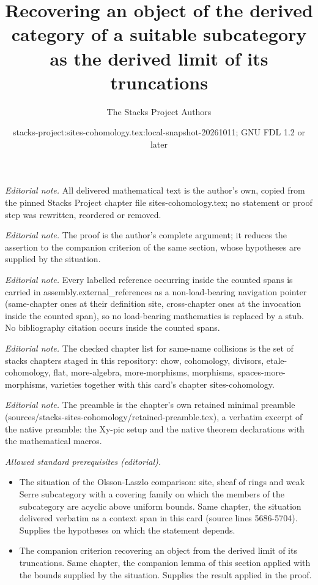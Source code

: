 \documentclass[10pt,a4paper]{amsart}
\title{Recovering an object of the derived category of a suitable subcategory as the derived limit of its truncations}
\author{The Stacks Project Authors}
\date{stacks-project:sites-cohomology.tex:local-snapshot-20261011; GNU FDL 1.2 or later}
\theoremstyle{plain}
\theoremstyle{definition}
\theoremstyle{remark}
\numberwithin{equation}{subsection}
\begin{document}
\maketitle
\noindent\textit{Editorial note.} All delivered mathematical text is the author's own, copied from the pinned Stacks Project chapter file sites-cohomology.tex; no statement or proof step was rewritten, reordered or removed.\par\medskip
\noindent\textit{Editorial note.} The proof is the author's complete argument; it reduces the assertion to the companion criterion of the same section, whose hypotheses are supplied by the situation.\par\medskip
\noindent\textit{Editorial note.} Every labelled reference occurring inside the counted spans is carried in assembly.external\_references as a non-load-bearing navigation pointer (same-chapter ones at their definition site, cross-chapter ones at the invocation inside the counted span), so no load-bearing mathematics is replaced by a stub. No bibliography citation occurs inside the counted spans.\par\medskip
\noindent\textit{Editorial note.} The checked chapter list for same-name collisions is the set of stacks chapters staged in this repository: chow, cohomology, divisors, etale-cohomology, flat, more-algebra, more-morphisms, morphisms, spaces-more-morphisms, varieties together with this card's chapter sites-cohomology.\par\medskip
\noindent\textit{Editorial note.} The preamble is the chapter's own retained minimal preamble (sources/stacks-sites-cohomology/retained-preamble.tex), a verbatim excerpt of the native preamble: the Xy-pic setup and the native theorem declarations with the mathematical macros.\par\medskip
\noindent\textit{Allowed standard prerequisites (editorial).}\begin{itemize}
\item The situation of the Olsson-Laszlo comparison: site, sheaf of rings and weak Serre subcategory with a covering family on which the members of the subcategory are acyclic above uniform bounds. Same chapter, the situation delivered verbatim as a context span in this card (source lines 5686-5704). Supplies the hypotheses on which the statement depends.
\item The companion criterion recovering an object from the derived limit of its truncations. Same chapter, the companion lemma of this section applied with the bounds supplied by the situation. Supplies the result applied in the proof.
\end{itemize}\medskip
\end{document}
